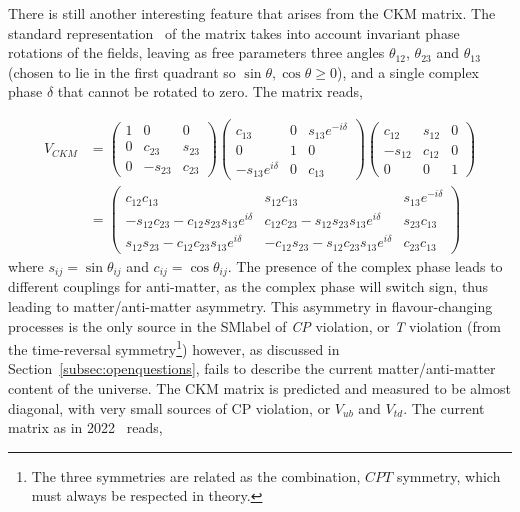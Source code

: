 There is still another interesting feature that arises from the CKM matrix. The standard representation~\cite{Ling-Lie} of the matrix takes into account invariant phase rotations of the fields, leaving as free parameters three angles $\theta_{12}$, $\theta_{23}$ and $\theta_{13}$ (chosen to lie in the first quadrant so $\sin\theta,\cos\theta\geq0$), and a single complex phase $\delta$ that cannot be rotated to zero. The matrix reads,

\begin{equation}
\begin{split}
    V_{CKM} &= \begin{pmatrix} 1 & 0 & 0 \\ 0 & c_{23} & s_{23} \\ 0 & -s_{23} & c_{23} \end{pmatrix} \begin{pmatrix} c_{13} & 0 & s_{13}e^{-i\delta} \\ 0 & 1 & 0 \\ -s_{13}e^{i\delta} & 0 & c_{13} \end{pmatrix}
    \begin{pmatrix} c_{12} & s_{12} & 0 \\ -s_{12} & c_{12} & 0 \\ 0 & 0 & 1 \end{pmatrix} \\ 
    &= \begin{pmatrix} c_{12}c_{13} & s_{12}c_{13} & s_{13}e^{-i\delta} \\ -s_{12}c_{23}-c_{12}s_{23}s_{13}e^{i\delta} & c_{12}c_{23}-s_{12}s_{23}s_{13}e^{i\delta} & s_{23}c_{13} \\ s_{12}s_{23}-c_{12}c_{23}s_{13}e^{i\delta} & -c_{12}s_{23}-s_{12}c_{23}s_{13}e^{i\delta} & c_{23}c_{13} \end{pmatrix}
\end{split}
\end{equation}
where $s_{ij}=\sin\theta_{ij}$ and $c_{ij}=\cos\theta_{ij}$. The presence of the complex phase leads to different couplings for anti-matter, as the complex phase will switch sign, thus leading to matter/anti-matter asymmetry. This asymmetry in flavour-changing processes is the only source in the \acrshort{SMlabel} of \textit{CP} violation, or \textit{T} violation (from the time-reversal symmetry\footnote{The three symmetries are related as the combination, $CPT$ symmetry, which must always be respected in theory.}) however, as discussed in Section~\ref{subsec:openquestions}, fails to describe the current matter/anti-matter content of the universe. The CKM matrix is predicted and measured to be almost diagonal, with very small sources of CP violation, or $V_{ub}$ and $V_{td}$. The current matrix as in 2022~\cite{pdg} reads, 
